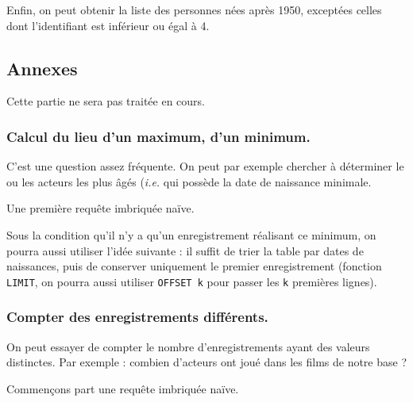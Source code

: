 Enfin, on peut obtenir la liste des personnes nées après 1950, exceptées celles dont l'identifiant est inférieur ou égal à 4. 


\begin{center}
\end{center}

\subsection{Annexes}

Cette partie ne sera pas traitée en cours.

\subsubsection{Calcul du lieu d'un maximum, d'un minimum.}
C'est une question assez fréquente. On peut par exemple chercher à déterminer le ou les acteurs les plus âgés (\emph{i.e.} qui possède la date de naissance minimale. 

Une première requête imbriquée naïve. 


\begin{center}
\end{center}

Sous la condition qu'il n'y a qu'un enregistrement réalisant ce minimum, on pourra aussi utiliser l'idée suivante : il suffit de trier la table par dates de naissances, puis de conserver uniquement le premier enregistrement (fonction \texttt{LIMIT}, on pourra aussi utiliser  \texttt{OFFSET k} pour passer les \texttt{k} premières lignes).

\begin{center}
\end{center}

\subsubsection{Compter des enregistrements différents.}

On peut essayer de compter le nombre d'enregistrements ayant des valeurs distinctes. Par exemple : combien d'acteurs ont joué dans les films de notre base ? 

Commençons part une requête imbriquée naïve. 

\begin{center}
\end{center}

